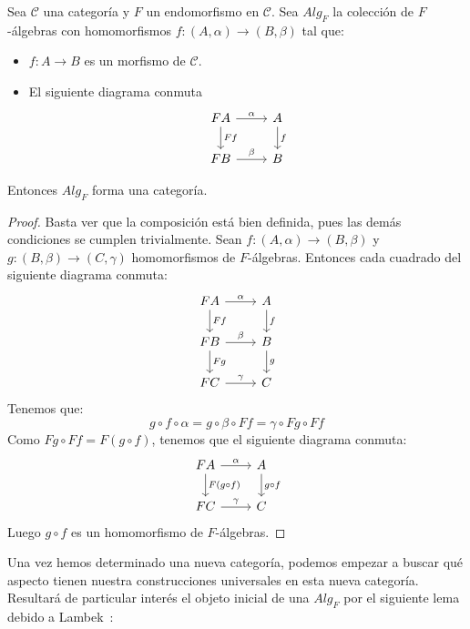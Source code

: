 \documentclass[12pt, twoside]{book}
\newcommand{\cat}{{\mathcal{C}}}
\begin{document}
\begin{proposition}\label{prop:fmorfismo}
Sea $\cat$ una categoría y $F$ un endomorfismo en $\cat$.
Sea $Alg_F$ la colección de $F$-álgebras con homomorfismos $f \colon (A,\alpha) \to (B,\beta)$ tal que:
\begin{itemize}
\item $f \colon A \to B$ es un morfismo de $\cat$.
\item El siguiente diagrama conmuta
\[
\begin{tikzcd}
F A \arrow[r,"\alpha"] \arrow[d,"F f"] & A \arrow[d,"f"]\\
F B \arrow[r,"\beta"] & B
\end{tikzcd}
\]
\end{itemize}
Entonces $Alg_F$ forma una categoría.
\end{proposition}
\begin{proof}
Basta ver que la composición está bien definida, pues las demás condiciones se cumplen trivialmente.
Sean $f \colon (A,\alpha) \to (B,\beta)$ y $g \colon (B,\beta) \to (C,\gamma)$ homomorfismos de $F$-álgebras.
Entonces cada cuadrado del siguiente diagrama conmuta:
\[
\begin{tikzcd}
F A \arrow[r,"\alpha"] \arrow[d,"F f"] & A \arrow[d,"f"]\\
F B \arrow[r,"\beta"] \arrow[d,"F g"] & B \arrow[d,"g"]\\
F C \arrow[r,"\gamma"] & C
\end{tikzcd}
\]
Tenemos que:
\[ g \circ f \circ \alpha = g \circ \beta \circ F f = \gamma \circ F g \circ F f \]
Como $F g \circ F f = F (g \circ f)$, tenemos que el siguiente diagrama conmuta:
\[
\begin{tikzcd}
F A \arrow[r,"\alpha"] \arrow[d,"F (g \circ f)"] & A \arrow[d,"g \circ f"]\\
F C \arrow[r,"\gamma"] & C
\end{tikzcd}
\]
Luego $g \circ f$ es un homomorfismo de $F$-álgebras.
\end{proof}

Una vez hemos determinado una nueva categoría, podemos empezar a buscar qué aspecto tienen nuestra construcciones universales en esta nueva categoría.
Resultará de particular interés el objeto inicial de una $Alg_F$ por el siguiente lema debido a Lambek~\cite{lambek}:
\end{document}
